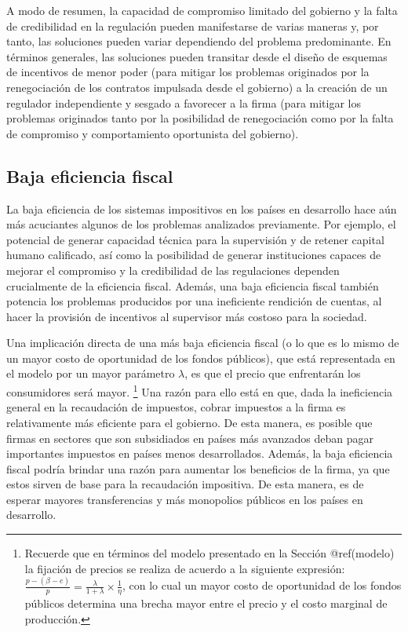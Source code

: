 \documentclass[
  12pt,
  spanish,
]{book}
\begin{document}
A modo de resumen, la capacidad de compromiso limitado del gobierno y la
falta de credibilidad en la regulación pueden manifestarse de varias
maneras y, por tanto, las soluciones pueden variar dependiendo del
problema predominante. En términos generales, las soluciones pueden
transitar desde el diseño de esquemas de incentivos de menor poder (para
mitigar los problemas originados por la renegociación de los contratos
impulsada desde el gobierno) a la creación de un regulador independiente
y sesgado a favorecer a la firma (para mitigar los problemas originados
tanto por la posibilidad de renegociación como por la falta de
compromiso y comportamiento oportunista del gobierno).

\hypertarget{baja-eficiencia-fiscal}{%
\subsection{Baja eficiencia fiscal}\label{baja-eficiencia-fiscal}}

La baja eficiencia de los sistemas impositivos en los países en
desarrollo hace aún más acuciantes algunos de los problemas analizados
previamente. Por ejemplo, el potencial de generar capacidad técnica para
la supervisión y de retener capital humano calificado, así como la
posibilidad de generar instituciones capaces de mejorar el compromiso y
la credibilidad de las regulaciones dependen crucialmente de la
eficiencia fiscal. Además, una baja eficiencia fiscal también potencia
los problemas producidos por una ineficiente rendición de cuentas, al
hacer la provisión de incentivos al supervisor más costoso para la
sociedad.

Una implicación directa de una más baja eficiencia fiscal (o lo que es
lo mismo de un mayor costo de oportunidad de los fondos públicos), que
está representada en el modelo por un mayor parámetro \(λ\), es que el
precio que enfrentarán los consumidores será mayor. \footnote{Recuerde
  que en términos del modelo presentado en la Sección @ref(modelo) la
  fijación de precios se realiza de acuerdo a la siguiente expresión:
  \(\frac{p-\left(\beta-e\right)}{p}=\frac{\lambda}{1+\lambda}\times\frac{1}{\eta}\),
  con lo cual un mayor costo de oportunidad de los fondos públicos
  determina una brecha mayor entre el precio y el costo marginal de
  producción.} Una razón para ello está en que, dada la ineficiencia
general en la recaudación de impuestos, cobrar impuestos a la firma es
relativamente más eficiente para el gobierno. De esta manera, es posible
que firmas en sectores que son subsidiados en países más avanzados deban
pagar importantes impuestos en países menos desarrollados. Además, la
baja eficiencia fiscal podría brindar una razón para aumentar los
beneficios de la firma, ya que estos sirven de base para la recaudación
impositiva. De esta manera, es de esperar mayores transferencias y más
monopolios públicos en los países en desarrollo.
\end{document}
